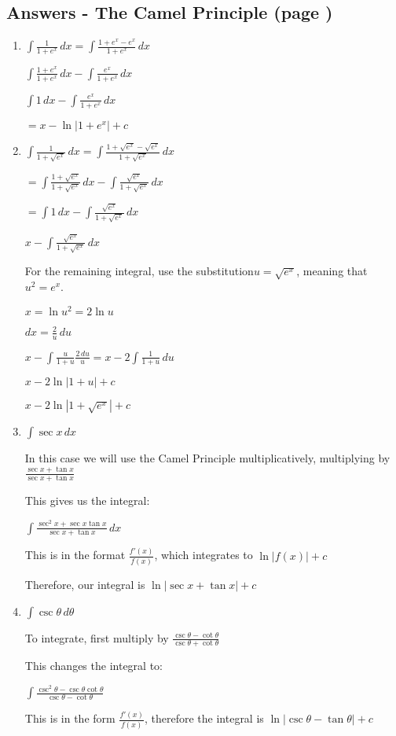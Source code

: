 \documentclass[../main.tex]{subfiles}
\begin{document}
\subsection*{Answers - The Camel Principle (page \pageref{Camel Principle})}

\begin{enumerate}
    \item 
    \(\int \frac{1}{1+e^x}\,dx=\int \frac{1+e^x-e^x}{1+e^x}\,dx\)
    
    \(\int \frac{1+e^x}{1+e^x}\,dx-\int \frac{e^x}{1+e^x}\,dx\)

    \(\int 1\,dx-\int \frac{e^x}{1+e^x}\,dx\)

    \(=x-\ln{|1+e^x|}+c\)
    
    \item 
    \(\int \frac{1}{1+\sqrt{e^x}}\,dx=\int \frac{1+\sqrt{e^x}-\sqrt{e^x}}{1+\sqrt{e^x}}\,dx\)

    \(=\int \frac{1+\sqrt{e^x}}{1+\sqrt{e^x}}\,dx-\int \frac{\sqrt{e^x}}{1+\sqrt{e^x}}\,dx\)

    \(=\int 1\,dx-\int \frac{\sqrt{e^x}}{1+\sqrt{e^x}}\,dx\)

    \(x-\int \frac{\sqrt{e^x}}{1+\sqrt{e^x}}\,dx\)

    For the remaining integral, use the substitution\(u=\sqrt{e^x}\), meaning that \(u^2=e^x\).

    \(x=\ln{u^2}=2\ln{u}\)

    \(dx=\frac{2}{u}\,du\)

    \(x-\int \frac{u}{1+u}\frac{2\,du}{u}=x-2\int \frac{1}{1+u}\,du\)

    \(x-2\ln{|1+u|}+c\)

    \(x-2\ln{|1+\sqrt{e^x}|}+c\)
    
    \item 
    \(\int \sec{x}\,dx\)

    In this case we will use the Camel Principle multiplicatively, multiplying by \(\frac{\sec{x}+\tan{x}}{\sec{x}+\tan{x}}\)

    This gives us the integral:

    \(\int \frac{\sec^2{x}+\sec{x}\tan{x}}{\sec{x}+\tan{x}}\,dx\)

    This is in the format \(\frac{f'(x)}{f(x)}\), which integrates to \(\ln{|f(x)|}+c\)

    Therefore, our integral is \(\ln{|\sec{x}+\tan{x}|}+c\)

    \item 
    \(\int \csc{\theta}\,d\theta\)

    To integrate, first multiply by \(\frac{\csc{\theta}-\cot{\theta}}{\csc{\theta}+\cot{\theta}}\)

    This changes the integral to:

    \(\int \frac{\csc^2{\theta}-\csc{\theta}\cot{\theta}}{\csc{\theta}-\cot{\theta}}\)

    This is in the form \(\frac{f'(x)}{f(x)}\), therefore the integral is \(\ln{|\csc{\theta}-\tan{\theta}|}+c\)
    
    
\end{enumerate}
\end{document}
